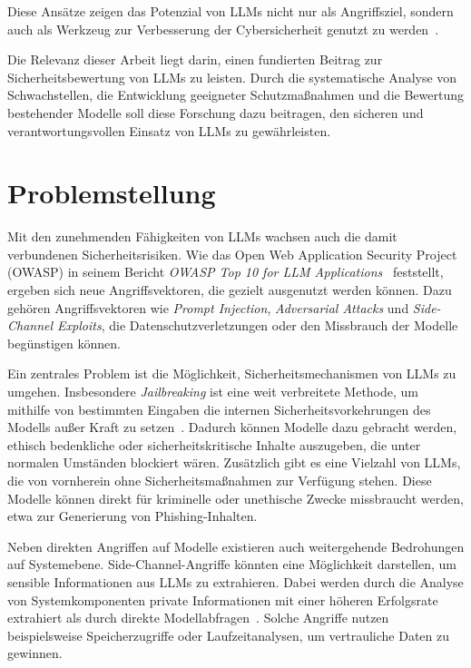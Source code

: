 \documentclass[german,exposee,master]{i1thesis}
\begin{document}
Diese Ansätze zeigen das Potenzial von LLMs nicht nur als Angriffsziel, 
sondern auch als Werkzeug zur Verbesserung der Cybersicherheit genutzt zu werden~\cite{xu2024}.

Die Relevanz dieser Arbeit liegt darin, einen fundierten Beitrag zur Sicherheitsbewertung von LLMs zu leisten. 
Durch die systematische Analyse von Schwachstellen, die Entwicklung geeigneter Schutzmaßnahmen und die Bewertung bestehender Modelle soll diese Forschung dazu beitragen, 
den sicheren und verantwortungsvollen Einsatz von LLMs zu gewährleisten.


\section{Problemstellung}\label{sec:problemstellung}

Mit den zunehmenden Fähigkeiten von LLMs wachsen auch die damit verbundenen Sicherheitsrisiken. 
Wie das Open Web Application Security Project (OWASP) in seinem Bericht \textit{OWASP Top 10 for LLM Applications}~\cite{owasp2023} feststellt, 
ergeben sich neue Angriffsvektoren, die gezielt ausgenutzt werden können. 
Dazu gehören Angriffsvektoren wie \textit{Prompt Injection}, \textit{Adversarial Attacks} und \textit{Side-Channel Exploits}, 
die Datenschutzverletzungen oder den Missbrauch der Modelle begünstigen können.~\cite{ferrag2025, hassanin2024}

Ein zentrales Problem ist die Möglichkeit, Sicherheitsmechanismen von LLMs zu umgehen. 
Insbesondere \textit{Jailbreaking} ist eine weit verbreitete Methode, 
um mithilfe von bestimmten Eingaben die internen Sicherheitsvorkehrungen des Modells außer Kraft zu setzen~\cite{yao2024}. 
Dadurch können Modelle dazu gebracht werden, ethisch bedenkliche oder sicherheitskritische Inhalte auszugeben, die unter normalen Umständen blockiert wären. 
Zusätzlich gibt es eine Vielzahl von LLMs, die von vornherein ohne Sicherheitsmaßnahmen zur Verfügung stehen. 
Diese Modelle können direkt für kriminelle oder unethische Zwecke missbraucht werden, etwa zur Generierung von Phishing-Inhalten.~\cite{owasp2023}

Neben direkten Angriffen auf Modelle existieren auch weitergehende Bedrohungen auf Systemebene. 
Side-Channel-Angriffe könnten eine Möglichkeit darstellen, um sensible Informationen aus LLMs zu extrahieren.
Dabei werden durch die Analyse von Systemkomponenten private Informationen mit einer höheren Erfolgsrate extrahiert als durch direkte Modellabfragen~\cite{yao2024}. 
Solche Angriffe nutzen beispielsweise Speicherzugriffe oder Laufzeitanalysen, um vertrauliche Daten zu gewinnen.
\end{document}
